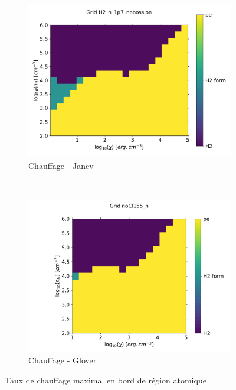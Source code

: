 \begin{figure}[!htbp]
    \centering
    \begin{subfigure}[t]{0.45\textwidth} %
        \centering \includegraphics[trim = {0 0 0 0 },clip,width=1\textwidth]{figure/H2/JanevGlover/janev/mapGmax.pdf}
        \caption{Chauffage - Janev}
    \end{subfigure}
    ~ 
    \begin{subfigure}[t]{0.45\textwidth}
        \centering \includegraphics[trim = {0 0 0 0 },clip,width=1\textwidth]{figure/H2/JanevGlover/glover/mapGmax.pdf}
        \caption{Chauffage - Glover}
    \end{subfigure}
    \label{fig:H2:JanevGlover:Gmax}
    \caption{Taux de chauffage maximal en bord de région atomique}
    

\end{figure}
